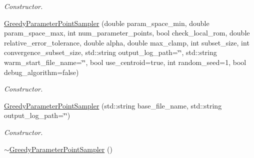 \begin{DoxyCompactItemize}
\begin{DoxyCompactList}\small\item\em Constructor. \end{DoxyCompactList}\item 
\hyperlink{class_c_a_r_o_m_1_1_greedy_parameter_point_sampler_a8fc1149ba932fe7c625cc83cf628397b}{Greedy\-Parameter\-Point\-Sampler} (double param\-\_\-space\-\_\-min, double param\-\_\-space\-\_\-max, int num\-\_\-parameter\-\_\-points, bool check\-\_\-local\-\_\-rom, double relative\-\_\-error\-\_\-tolerance, double alpha, double max\-\_\-clamp, int subset\-\_\-size, int convergence\-\_\-subset\-\_\-size, std\-::string output\-\_\-log\-\_\-path=\char`\"{}\char`\"{}, std\-::string warm\-\_\-start\-\_\-file\-\_\-name=\char`\"{}\char`\"{}, bool use\-\_\-centroid=true, int random\-\_\-seed=1, bool debug\-\_\-algorithm=false)
\begin{DoxyCompactList}\small\item\em Constructor. \end{DoxyCompactList}\item 
\hyperlink{class_c_a_r_o_m_1_1_greedy_parameter_point_sampler_a19dd01b24759d0a1499d60aadf19e42f}{Greedy\-Parameter\-Point\-Sampler} (std\-::string base\-\_\-file\-\_\-name, std\-::string output\-\_\-log\-\_\-path=\char`\"{}\char`\"{})
\begin{DoxyCompactList}\small\item\em Constructor. \end{DoxyCompactList}\item 
\hypertarget{class_c_a_r_o_m_1_1_greedy_parameter_point_sampler_af3f0ff8f2ecd6d4f2d5591e992b0cb51}{\hyperlink{class_c_a_r_o_m_1_1_greedy_parameter_point_sampler_af3f0ff8f2ecd6d4f2d5591e992b0cb51}{$\sim$\-Greedy\-Parameter\-Point\-Sampler} ()}\label{class_c_a_r_o_m_1_1_greedy_parameter_point_sampler_af3f0ff8f2ecd6d4f2d5591e992b0cb51}


\end{DoxyCompactItemize}
